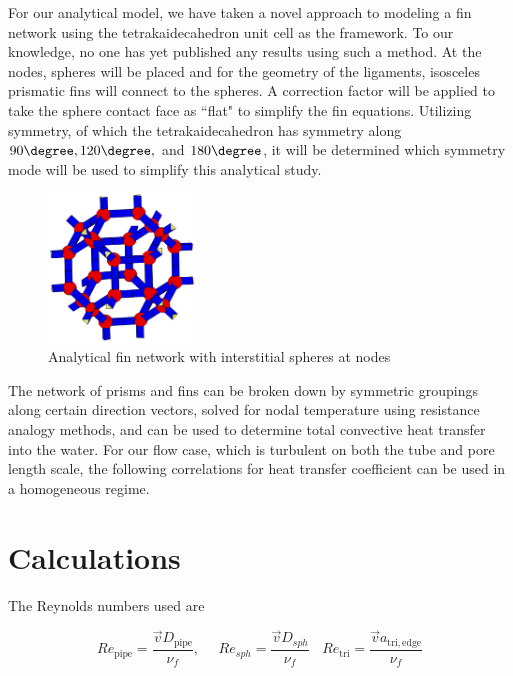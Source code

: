 \documentclass[compileTAMUreport.tex]{subfiles}
\begin{document}
For our analytical model, we have taken a novel approach to modeling a fin network using the tetrakaidecahedron unit cell as the framework.
To our knowledge, no one has yet published any results using such a method. 
At the nodes, spheres will be placed and for the geometry of the ligaments, isosceles prismatic fins will connect to the spheres. 
A correction factor will be applied to take the sphere contact face as ``flat" to simplify the fin equations. 
Utilizing symmetry, of which the tetrakaidecahedron has symmetry along $90\degree, 120\degree,$ and $180\degree$, it will be determined which symmetry mode will be used to simplify this analytical study.



\begin{figure}[H]
\begin{center}
\includegraphics[width=0.35\textwidth]{./figure/AnalyticalUnitCell}
\end{center}
\caption{Analytical fin network with interstitial spheres at nodes}
\label{fig:flowregime}
\end{figure}

The network of prisms and fins can be broken down by symmetric groupings along certain direction vectors, solved for nodal temperature using resistance analogy methods, and can be used to determine total convective heat transfer into the water. 
For our flow case, which is turbulent on both the tube and pore length scale, the following correlations for heat transfer coefficient can be used in a homogeneous regime.


\section{Calculations}

The Reynolds numbers used are

\begin{equation}
 Re_{\mathrm{pipe}} = \frac{\vec{v} D_{\mathrm{pipe}}}{\nu_f}, ~~~~~~ Re_{sph} = \frac{\vec{v} D_{sph}}{\nu_f} ~~~~ Re_{\mathrm{tri}} = \frac{\vec{v} a_{\mathrm{tri,edge}}}{\nu_f}
\end{equation}
\end{document}
